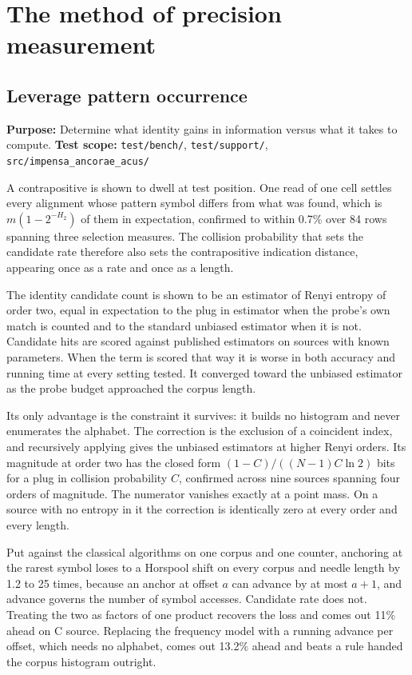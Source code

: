\chapter{The method of precision measurement}

\section{Leverage pattern occurrence}

\textbf{Purpose:} Determine what identity gains in information versus what it takes to compute. \textbf{Test scope:} \texttt{test/\allowbreak{}bench/\allowbreak{}}, \texttt{test/\allowbreak{}support/\allowbreak{}}, \texttt{src/\allowbreak{}impensa\_\allowbreak{}ancorae\_\allowbreak{}acus/\allowbreak{}}

A contrapositive is shown to dwell at test position. One read of one cell settles every alignment whose pattern symbol differs from what was found, which is \(m(1-2^{-H_2})\) of them in expectation, confirmed to within 0.7\% over 84 rows spanning three selection measures. The collision probability that sets the candidate rate therefore also sets the contrapositive indication distance, appearing once as a rate and once as a length.

The identity candidate count is shown to be an estimator of Renyi entropy of order two, equal in expectation to the plug in estimator when the probe's own match is counted and to the standard unbiased estimator when it is not. Candidate hits are scored against published estimators on sources with known parameters. When the term is scored that way it is worse in both accuracy and running time at every setting tested. It converged toward the unbiased estimator as the probe budget approached the corpus length.

Its only advantage is the constraint it survives: it builds no histogram and never enumerates the alphabet. The correction is the exclusion of a coincident index, and recursively applying gives the unbiased estimators at higher Renyi orders. Its magnitude at order two has the closed form \((1-C)/((N-1)C\ln 2)\) bits for a plug in collision probability \(C\), confirmed across nine sources spanning four orders of magnitude. The numerator vanishes exactly at a point mass. On a source with no entropy in it the correction is identically zero at every order and every length.

Put against the classical algorithms on one corpus and one counter, anchoring at the rarest symbol loses to a Horspool shift on every corpus and needle length by 1.2 to 25 times, because an anchor at offset \(a\) can advance by at most \(a+1\), and advance governs the number of symbol accesses. Candidate rate does not. Treating the two as factors of one product recovers the loss and comes out 11\% ahead on C source. Replacing the frequency model with a running advance per offset, which needs no alphabet, comes out 13.2\% ahead and beats a rule handed the corpus histogram outright.


